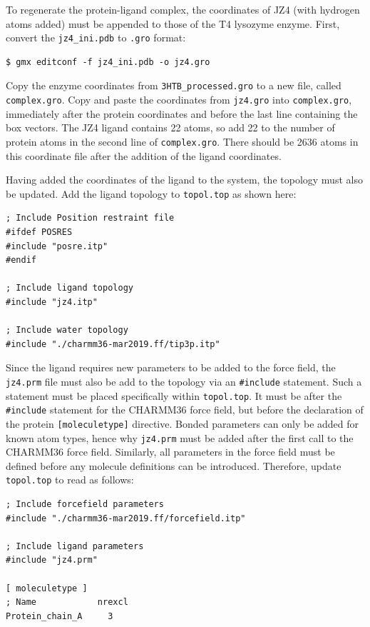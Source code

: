 \documentclass[9pt,tutorial,pubversion]{livecoms}
\begin{document}
To regenerate the protein-ligand complex, the coordinates of JZ4 (with hydrogen atoms added) must be appended to those of the T4 lysozyme enzyme. First, convert the \texttt{jz4\_ini.pdb} to \texttt{.gro} format:

\begin{lstlisting}
$ gmx editconf -f jz4_ini.pdb -o jz4.gro
\end{lstlisting}

Copy the enzyme coordinates from \texttt{3HTB\_processed.gro} to a new file, called \texttt{complex.gro}. Copy and paste the coordinates from \texttt{jz4.gro} into \texttt{complex.gro}, immediately after the protein coordinates and before the last line containing the box vectors. The JZ4 ligand contains 22 atoms, so add 22 to the number of protein atoms in the second line of \texttt{complex.gro}. There should be 2636 atoms in this coordinate file after the addition of the ligand coordinates.

Having added the coordinates of the ligand to the system, the topology must also be updated. Add the ligand topology to \texttt{topol.top} as shown here:

\begin{lstlisting}
; Include Position restraint file
#ifdef POSRES
#include "posre.itp"
#endif

; Include ligand topology
#include "jz4.itp"

; Include water topology
#include "./charmm36-mar2019.ff/tip3p.itp"
\end{lstlisting}

Since the ligand requires new parameters to be added to the force field, the \texttt{jz4.prm} file must also be add to the topology via an \texttt{\#include} statement. Such a statement must be placed specifically within \texttt{topol.top}. It must be after the \texttt{\#include} statement for the CHARMM36 force field, but before the declaration of the protein \texttt{[moleculetype]} directive. Bonded parameters can only be added for known atom types, hence why \texttt{jz4.prm} must be added after the first call to the CHARMM36 force field. Similarly, all parameters in the force field must be defined before any molecule definitions can be introduced. Therefore, update \texttt{topol.top} to read as follows:

\begin{lstlisting}[basicstyle=\small\ttfamily]
; Include forcefield parameters
#include "./charmm36-mar2019.ff/forcefield.itp"

; Include ligand parameters
#include "jz4.prm"

[ moleculetype ]
; Name            nrexcl
Protein_chain_A     3
\end{lstlisting}
\end{document}

